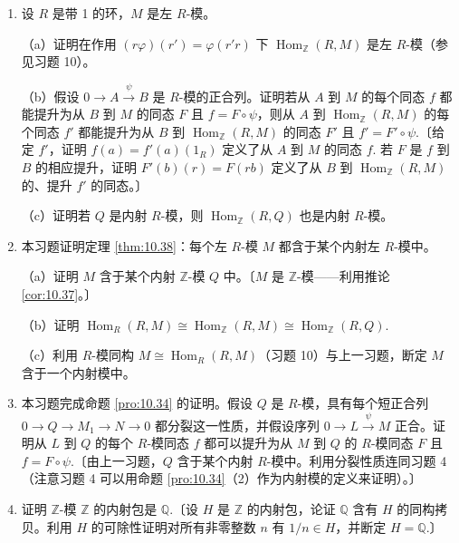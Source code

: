 \begin{enumerate}
（b）证明相应的序列
\[
0 \longrightarrow \operatorname{Hom}_R(N, D) \xrightarrow{\ \varphi'\ } \operatorname{Hom}_R(M, D) \xrightarrow{\ \psi'\ } \operatorname{Hom}_R(L, D) \longrightarrow 0
\]
对所有 \(R\)-模 \(D\) 都是阿贝尔群的短正合列，当且仅当原来的序列是分裂短正合列。

\item 设 \(R\) 是带 1 的环，\(M\) 是左 \(R\)-模。

（a）证明在作用 \((r\varphi)(r') = \varphi(r'r)\) 下 \(\operatorname{Hom}_{\mathbb{Z}}(R, M)\) 是左 \(R\)-模（参见习题 10）。

（b）假设 \(0 \to A \xrightarrow{\psi} B\) 是 \(R\)-模的正合列。证明若从 \(A\) 到 \(M\) 的每个同态 \(f\) 都能提升为从 \(B\) 到 \(M\) 的同态 \(F\) 且 \(f = F \circ \psi\)，则从 \(A\) 到 \(\operatorname{Hom}_{\mathbb{Z}}(R, M)\) 的每个同态 \(f'\) 都能提升为从 \(B\) 到 \(\operatorname{Hom}_{\mathbb{Z}}(R, M)\) 的同态 \(F'\) 且 \(f' = F' \circ \psi\).〔给定 \(f'\)，证明 \(f(a) = f'(a)(1_R)\) 定义了从 \(A\) 到 \(M\) 的同态 \(f\). 若 \(F\) 是 \(f\) 到 \(B\) 的相应提升，证明 \(F'(b)(r) = F(rb)\) 定义了从 \(B\) 到 \(\operatorname{Hom}_{\mathbb{Z}}(R, M)\) 的、提升 \(f'\) 的同态。〕

（c）证明若 \(Q\) 是内射 \(R\)-模，则 \(\operatorname{Hom}_{\mathbb{Z}}(R, Q)\) 也是内射 \(R\)-模。

\item 本习题证明定理 \ref{thm:10.38}：每个左 \(R\)-模 \(M\) 都含于某个内射左 \(R\)-模中。

（a）证明 \(M\) 含于某个内射 \(\mathbb{Z}\)-模 \(Q\) 中。〔\(M\) 是 \(\mathbb{Z}\)-模——利用推论 \ref{cor:10.37}。〕

（b）证明 \(\operatorname{Hom}_R(R, M) \cong \operatorname{Hom}_{\mathbb{Z}}(R, M) \cong \operatorname{Hom}_{\mathbb{Z}}(R, Q)\).

（c）利用 \(R\)-模同构 \(M \cong \operatorname{Hom}_R(R, M)\)（习题 10）与上一习题，断定 \(M\) 含于一个内射模中。

\item 本习题完成命题 \ref{pro:10.34} 的证明。假设 \(Q\) 是 \(R\)-模，具有每个短正合列 \(0 \to Q \to M_1 \to N \to 0\) 都分裂这一性质，并假设序列 \(0 \to L \xrightarrow{\psi} M\) 正合。证明从 \(L\) 到 \(Q\) 的每个 \(R\)-模同态 \(f\) 都可以提升为从 \(M\) 到 \(Q\) 的 \(R\)-模同态 \(F\) 且 \(f = F \circ \psi\).〔由上一习题，\(Q\) 含于某个内射 \(R\)-模中。利用分裂性质连同习题 4（注意习题 4 可以用命题 \ref{pro:10.34}（2）作为内射模的定义来证明）。〕

\item 证明 \(\mathbb{Z}\)-模 \(\mathbb{Z}\) 的内射包是 \(\mathbb{Q}\).〔设 \(H\) 是 \(\mathbb{Z}\) 的内射包，论证 \(\mathbb{Q}\) 含有 \(H\) 的同构拷贝。利用 \(H\) 的可除性证明对所有非零整数 \(n\) 有 \(1/n \in H\)，并断定 \(H = \mathbb{Q}\).〕


\end{enumerate}
